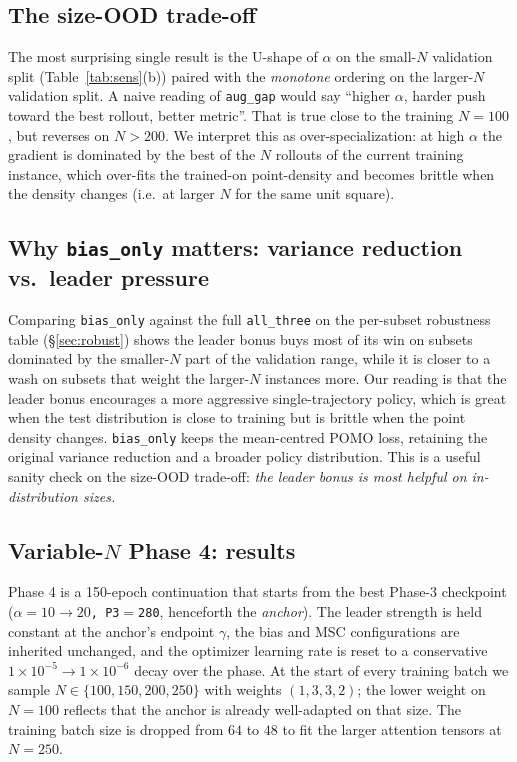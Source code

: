 \documentclass[11pt,a4paper]{article}
\begin{document}
\subsection{The size-OOD trade-off}

The most surprising single result is the U-shape of $\alpha$ on the
small-$N$ validation split (Table~\ref{tab:sens}(b)) paired with the
\emph{monotone} ordering on the larger-$N$ validation split. A naive
reading of \texttt{aug\_gap} would say ``higher $\alpha$, harder push
toward the best rollout, better metric''. That is true close to the
training $N\!=\!100$, but reverses on $N>200$. We interpret this as
over-specialization: at high $\alpha$ the gradient is dominated by the
best of the $N$ rollouts of the current training instance, which over-fits
the trained-on point-density and becomes brittle when the density changes
(i.e.\ at larger $N$ for the same unit square).

\subsection{Why \texttt{bias\_only} matters: variance reduction vs.\ leader pressure}

Comparing \texttt{bias\_only} against the full \texttt{all\_three} on the
per-subset robustness table (\S\ref{sec:robust}) shows the leader bonus
buys most of its win on subsets dominated by the smaller-$N$ part of the
validation range, while it is closer to a wash on subsets that weight
the larger-$N$ instances more. Our reading is that the leader bonus
encourages a more aggressive single-trajectory policy, which is great when
the test distribution is close to training but is brittle when the point
density changes. \texttt{bias\_only} keeps the mean-centred POMO loss,
retaining the original variance reduction and a broader policy
distribution. This is a useful sanity check on the size-OOD trade-off:
\emph{the leader bonus is most helpful on in-distribution sizes.}

\subsection{Variable-$N$ Phase 4: results}

Phase 4 is a 150-epoch continuation that starts from the best Phase-3
checkpoint (\texttt{$\alpha\!=\!10\!\to\!20$, P3$=$280}, henceforth the
\emph{anchor}). The leader strength is held constant at the anchor's
endpoint $\gamma$, the bias and MSC configurations are inherited
unchanged, and the optimizer learning rate is reset to a conservative
$1{\times}10^{-5}\!\to\!1{\times}10^{-6}$ decay over the phase. At the
start of every training batch we sample $N \in \{100, 150, 200, 250\}$
with weights $(1, 3, 3, 2)$; the lower weight on $N\!=\!100$ reflects
that the anchor is already well-adapted on that size. The training batch
size is dropped from $64$ to $48$ to fit the larger attention tensors at
$N\!=\!250$.
\end{document}
